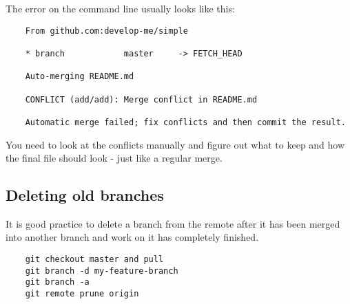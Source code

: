 The error on the command line usually looks like this:

\begin{verbatim}
    From github.com:develop-me/simple

    * branch            master     -> FETCH_HEAD
     
    Auto-merging README.md

    CONFLICT (add/add): Merge conflict in README.md

    Automatic merge failed; fix conflicts and then commit the result.
\end{verbatim}

You need to look at the conflicts manually and figure out what to keep and how the final file should look - just like a regular merge.
\\


\subsection{Deleting old branches}

It is good practice to delete a branch from the remote after it has been merged into another branch and work on it has completely finished.

\begin{verbatim}
    git checkout master and pull
    git branch -d my-feature-branch
    git branch -a
    git remote prune origin
\end{verbatim}
